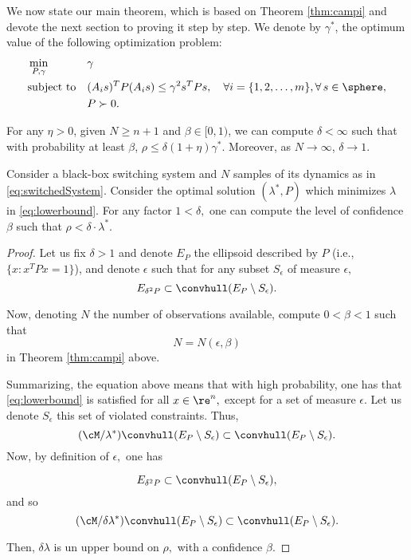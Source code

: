 We now state our main theorem, which is based on Theorem \ref{thm:campi} and devote the next section to proving it step by step. We denote by $\gamma^*$, the optimum value of the following optimization problem:
\begin{equation}
\begin{aligned}
& \min_{P, \gamma} & & \gamma \\
& \text{subject to} 
&  & (A_is)^TP(A_is) \leq \gamma^2 s^TPs, \quad \forall i = \{1,2, \ldots, m\},  \forall\, s \in \sphere,\\
& && P \succ 0. \\
\end{aligned}
\end{equation}

\begin{theorem} \label{thm:mainTheorem} For any $\eta > 0$, given $N \geq n+1$ and $\beta \in [0,1)$, we can compute $\delta < \infty$ such that with probability at least $\beta$, $\rho \leq \delta (1 + \eta) \gamma^*$. Moreover, as $N \to \infty$, $\delta \to 1$.
\end{theorem}



\begin{theorem}
Consider a black-box switching system and $N$ samples of its dynamics as in \eqref{eq:switchedSystem}. Consider the optimal solution $(\lambda^*,P)$ which minimizes $\lambda$ in \eqref{eq:lowerbound}. For any factor $1<\delta,$ one can compute the level of confidence $\beta$ such that $\rho<\delta\cdot\lambda^*.$ 
\end{theorem}

\begin{proof}
Let us fix $\delta>1$ and denote $E_P$ the ellipsoid described by $P$ (i.e., $\{x:x^TPx= 1\}$), and denote $\epsilon$ such that for any subset $S_\epsilon$ of measure $\epsilon,$ 
$$ E_{\delta^2P} \subset  \convhull (E_P\setminus S_\epsilon) .$$ 
  	
Now, denoting $N$ the number of observations available, compute $0< \beta< 1$ such that $$N=N(\epsilon,\beta)$$ in Theorem \ref{thm:campi} above. 

Summarizing, the equation above means that with high probability, one has that \eqref{eq:lowerbound} is satisfied for all $x\in \re^n,$ except for a set of measure $\epsilon.$  Let us denote $S_\epsilon$ this set of violated constraints.  Thus, $$(\cM/\lambda^*) \convhull (E_P\setminus S_\epsilon) \subset \convhull (E_P\setminus S_\epsilon).$$  Now, by definition of $\epsilon,$ one has

$$ E_{\delta^2P} \subset  \convhull (E_P\setminus S_\epsilon) ,$$ and so
$$
(\cM/\delta \lambda^*) \convhull (E_P \setminus S_\epsilon) \subset \convhull (E_P\setminus S_\epsilon).$$

Then, $\delta\lambda$ is un upper bound on $\rho,$ with a confidence $\beta.$ 
\end{proof}